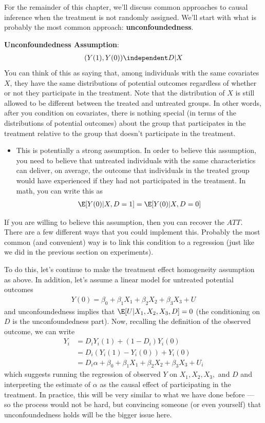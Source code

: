 \documentclass[
  letterpaper,
  DIV=11,
  numbers=noendperiod]{scrreprt}
\providecommand{\tightlist}{%
  \setlength{\itemsep}{0pt}\setlength{\parskip}{0pt}}\usepackage{longtable,booktabs,array}
\begin{document}
For the remainder of this chapter, we'll discuss common approaches to
causal inference when the treatment is not randomly assigned. We'll
start with what is probably the most common approach:
\textbf{unconfoundedness}.

\textbf{Unconfoundedness Assumption}: \begin{align*}
  (Y(1),Y(0)) \independent D | X
\end{align*} You can think of this as saying that, among individuals
with the same covariates \(X\), they have the same distributions of
potential outcomes regardless of whether or not they participate in the
treatment. Note that the distribution of \(X\) is still allowed to be
different between the treated and untreated groups. In other words,
after you condition on covariates, there is nothing special (in terms of
the distributions of potential outcomes) about the group that
participates in the treatment relative to the group that doesn't
participate in the treatment.

\begin{itemize}
\tightlist
\item
  This is potentially a strong assumption. In order to believe this
  assumption, you need to believe that untreated individuals with the
  same characteristics can deliver, on average, the outcome that
  individuals in the treated group would have experienced if they had
  not participated in the treatment. In math, you can write this as
  \begin{align*}
      \E[Y(0) | X, D=1] = \E[Y(0) | X, D=0]
    \end{align*}
\end{itemize}

If you are willing to believe this assumption, then you can recover the
\(ATT\). There are a few different ways that you could implement this.
Probably the most common (and convenient) way is to link this condition
to a regression (just like we did in the previous section on
experiments).

To do this, let's continue to make the treatment effect homogeneity
assumption as above. In addition, let's assume a linear model for
untreated potential outcomes \begin{align*}
  Y(0) = \beta_0 + \beta_1 X_1 + \beta_2 X_2 + \beta_3 X_3 + U
\end{align*} and unconfoundedness implies that
\(\E[U|X_1,X_2,X_3,D] = 0\) (the conditioning on \(D\) is the
unconfoundedness part). Now, recalling the definition of the observed
outcome, we can write \begin{align*}
  Y_i &= D_i Y_i(1) + (1-D_i) Y_i(0) \\
  &= D_i (Y_i(1) - Y_i(0)) + Y_i(0) \\
  &= D_i \alpha + \beta_0 + \beta_1 X_1 + \beta_2 X_2 + \beta_3 X_3 + U_i
\end{align*} which suggests running the regression of observed \(Y\) on
\(X_1,X_2,X_3,\) and \(D\) and interpreting the estimate of \(\alpha\)
as the causal effect of participating in the treatment. In practice,
this will be very similar to what we have done before --- so the process
would not be hard, but convincing someone (or even yourself) that
unconfoundedness holds will be the bigger issue here.
\end{document}

